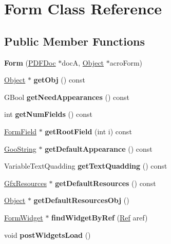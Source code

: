 \hypertarget{class_form}{}\section{Form Class Reference}
\label{class_form}
\subsection*{Public Member Functions}
\begin{DoxyCompactItemize}
\item 
\mbox{\label{class_form_a16d15bd339957ad5f48cef29f6d77936}} 
{\bfseries Form} (\hyperlink{class_p_d_f_doc}{P\+D\+F\+Doc} $\ast$docA, \hyperlink{class_object}{Object} $\ast$acro\+Form)
\item 
\mbox{\label{class_form_ae0782015ec0c3e9ef453af96dda8c7ff}} 
\hyperlink{class_object}{Object} $\ast$ {\bfseries get\+Obj} () const
\item 
\mbox{\label{class_form_a49819d494a5cde0f7eac827eb19042d7}} 
G\+Bool {\bfseries get\+Need\+Appearances} () const
\item 
\mbox{\label{class_form_a8229341191704262f4dc6c5168f3e819}} 
int {\bfseries get\+Num\+Fields} () const
\item 
\mbox{\label{class_form_aa9f196a652403abc2a458bf9682bb21c}} 
\hyperlink{class_form_field}{Form\+Field} $\ast$ {\bfseries get\+Root\+Field} (int i) const
\item 
\mbox{\label{class_form_a5dd3e9a8e626e67f07799c14f536cc08}} 
\hyperlink{class_goo_string}{Goo\+String} $\ast$ {\bfseries get\+Default\+Appearance} () const
\item 
\mbox{\label{class_form_a155c9acf7f32b3a98dea0e50779d34cc}} 
Variable\+Text\+Quadding {\bfseries get\+Text\+Quadding} () const
\item 
\mbox{\label{class_form_a99e2c952663730db44d9b9988d5adf03}} 
\hyperlink{class_gfx_resources}{Gfx\+Resources} $\ast$ {\bfseries get\+Default\+Resources} () const
\item 
\mbox{\label{class_form_ad4d395a4a93c0f7cd995a24610bc7209}} 
\hyperlink{class_object}{Object} $\ast$ {\bfseries get\+Default\+Resources\+Obj} ()
\item 
\mbox{\label{class_form_ae2a3e130a81bae6bcc14e6ee03802ba9}} 
\hyperlink{class_form_widget}{Form\+Widget} $\ast$ {\bfseries find\+Widget\+By\+Ref} (\hyperlink{struct_ref}{Ref} aref)
\item 
\mbox{\label{class_form_a11d343ad56734154aecf938eb1e817f7}} 
void {\bfseries post\+Widgets\+Load} ()
\end{DoxyCompactItemize}
